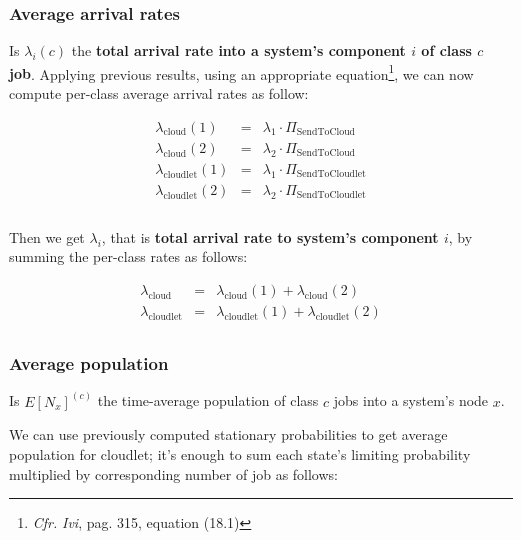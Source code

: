 \documentclass[10pt,a4paper]{article}
\begin{document}
\subsubsection{Average arrival rates}

Is $\lambda_i(c)$ the \textbf{total arrival rate into a system's component $i$ of class $c$ job}. Applying previous results, using an appropriate equation\footnote{\textit{Cfr.} \textit{Ivi}, pag. 315, equation (18.1)}, we can now compute per-class average arrival rates as follow:

\begin{equation}
\begin{array} {rcl}

\lambda_{\text{cloud}}(1) & = & \lambda_1\cdot \Pi_{\text{SendToCloud}} \\
\lambda_{\text{cloud}}(2) & = & \lambda_2\cdot \Pi_{\text{SendToCloud}} \\
\lambda_{\text{cloudlet}}(1) & = & \lambda_1\cdot \Pi_{\text{SendToCloudlet}} \\
\lambda_{\text{cloudlet}}(2) & = & \lambda_2\cdot \Pi_{\text{SendToCloudlet}} \\\\
\end{array}
\end{equation}

Then we get $\lambda_i$, that is \textbf{total arrival rate to system's component $i$}, by summing the per-class rates as follows:

\begin{equation}
\begin{array} {rcl}

\lambda_{\text{cloud}} & = & \lambda_{\text{cloud}}(1) + \lambda_{\text{cloud}}(2) \\
\lambda_{\text{cloudlet}} & = & \lambda_{\text{cloudlet}}(1) + \lambda_{\text{cloudlet}}(2) \\
\end{array}
\end{equation}


\subsubsection{Average population}

Is $E[N_x]^{(c)}$ the time-average population of class $c$ jobs into a system's node $x$. 

We can use previously computed stationary probabilities to get average population for cloudlet; it's enough to sum each state's limiting probability multiplied by corresponding number of job as follows:
\end{document}
